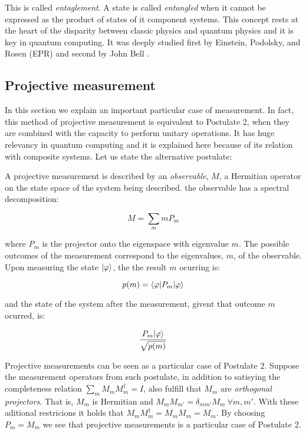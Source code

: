 This is called \emph{entaglement}. A state is called \emph{entangled} when it cannot be expressed as the product of states of it component systems. This concept rests at the heart of the disparity between classic physics and quantum physics and it is key in quantum computing. It was deeply studied first by Einstein, Podolsky, and Rosen (EPR) \cite{Einstein1935} and second by John Bell \cite{Bellt1964}.


\subsection{Projective measurement}


In this section we explain an important particular case of measurement. In fact, this method of projective measurement is equivalent to Postulate 2, when they are combined with the capacity to perform unitary operations. It has huge relevancy in quantum computing and it is explained here because of its relation with composite systems. Let us state the alternative postulate:

\begin{postulate 2'}
	A projective measurement is described by an \emph{observable}, $M$, a Hermitian operator on the state space of the system being described. the observable has a spectral decomposition:
	
	$$ M = \sum_m m P_m$$
	
	where $P_m$ is the projector onto the eigenspace with eigenvalue $m$. The possible outcomes of the measurement correspond to the eigenvalues, $m$, of the observable. Upon measuring the state $|\varphi\rangle$, the the result $m$ ocurring is:
		
	$$ p(m) = \langle \varphi | P_m | \varphi \rangle $$
	
	and the state of the system after the measurement, givent that outcome $m$ ocurred, is:
	
	$$ \frac{P_m |\varphi\rangle}{\sqrt{p(m)}} $$
\end{postulate 2'}

Projective measurements can be seen as a particular case of Postulate 2. Suppose the measurement operators from such postulate, in addition to satisying the completeness relation $\sum_m M_m M_m^\dagger = I$, also fulfill that $M_m$ are \emph{orthogonal projectors}. That is, $M_m$ is Hermitian and $M_m M_{m'} = \delta_{mm'} M_m \ \forall m,m'$. With these aditional restricions it holds that $M_m M_m^\dagger = M_m M_m = M_m$. By choosing $P_m = M_m$ we see that projective measurements is a particular case of Postulate 2.

